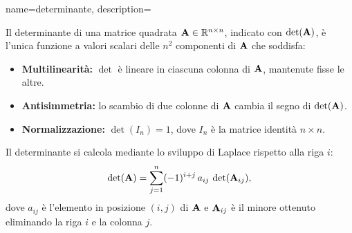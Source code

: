 {name={determinante},
 description={Il determinante di una matrice quadrata ${\bf A}\in\mathbb{R}^{n\times n}$, indicato con $\det({\bf A})$, è l’unica funzione a valori scalari delle $n^2$ componenti di ${\bf A}$ che soddisfa:
\begin{itemize}
  \item {\bf Multilinearità:} $\det$ è lineare in ciascuna colonna di ${\bf A}$, mantenute fisse le altre.
  \item {\bf Antisimmetria:} lo scambio di due colonne di ${\bf A}$ cambia il segno di $\det({\bf A})$.
  \item {\bf Normalizzazione:} $\det(I_n)=1$, dove $I_n$ è la matrice identità $n\times n$.
\end{itemize}
Il determinante si calcola mediante lo sviluppo di Laplace rispetto alla riga $i$:
\[
  \det({\bf A})
  = \sum_{j=1}^n (-1)^{i+j}\,a_{ij}\,\det({\bf A}_{ij}),
\]
dove $a_{ij}$ è l’elemento in posizione $(i,j)$ di ${\bf A}$ e ${\bf A}_{ij}$ è il minore ottenuto eliminando la riga $i$ e la colonna $j$.

}}
